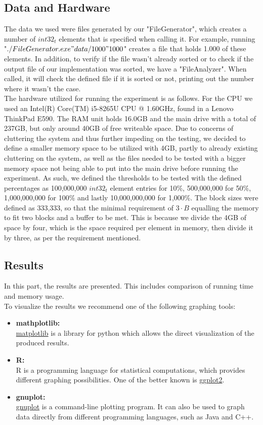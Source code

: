\documentclass[twocolumn]{article}
\begin{document}
\subsection{Data and Hardware}%
\label{sub:Data and Hardware}
The data we used were files generated by our "FileGenerator", which creates a number of $int32_t$ elements that is specified when calling it. For example, running "$./FileGenerator.exe "data/1000" 1000$" creates a file that holds 1.000 of these elements. In addition, to verify if the file wasn't already sorted or to check if the output file of our implementation was sorted, we have a "FileAnalyzer". When called, it will check the defined file if it is sorted or not, printing out the number where it wasn't the case.\\
The hardware utilized for running the experiment is as follows. For the CPU we used an Intel(R) Core(TM) i5-8265U CPU @ 1.60GHz, found in a Lenovo ThinkPad E590. The RAM unit holds 16.0GB and the main drive with a total of 237GB, but only around 40GB of free writeable space. Due to concerns of cluttering the system and thus further impeding on the testing, we decided to define a smaller memory space to be utilized with 4GB, partly to already existing cluttering on the system, as well as the files needed to be tested with a bigger memory space not being able to put into the main drive before running the experiment.
As such, we defined the thresholds to be tested with the defined percentages as 100,000,000 $int32_t$ element entries for 10\%, 500,000,000 for 50\%, 1,000,000,000 for 100\% and lastly 10,000,000,000 for 1,000\%. The block sizes were defined as 333,333, so that the minimal requirement of $3 \cdot B$ equalling the memory to fit two blocks and a buffer to be met. This is because we divide the 4GB of space by four, which is the space required per element in memory, then divide it by three, as per the requirement mentioned.

\subsection{Results}%
\label{sub:Results}
In this part, the results are presented. This includes comparison of running time and memory usage.\\
To visualize the results we recommend one of the following graphing tools:
\begin{itemize}
	\item \textbf{mathplotlib:}\\ 
		\href{https://matplotlib.org/}{matplotlib} is a library for python which allows the direct visualization of the produced results.
	\item \textbf{R:}\\
		R is a programming language for statistical computations, which provides different graphing possibilities. One of the better known is \href{https://ggplot2.tidyverse.org/}{ggplot2}.
	\item \textbf{gnuplot:}\\
		\href{http://www.gnuplot.info/}{gnuplot} is a command-line plotting program. It can also be used to graph data directly from different programming languages, such as Java and C++.
\end{itemize}
\end{document}
